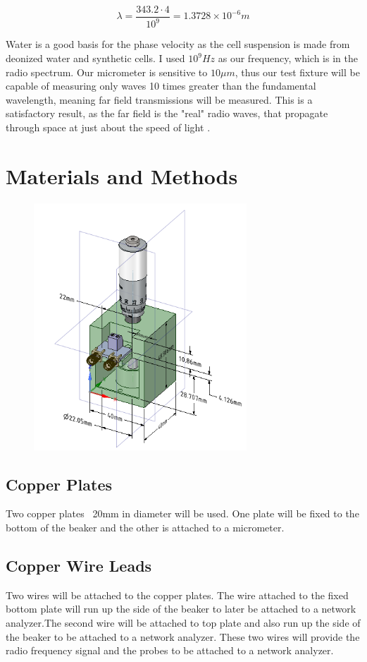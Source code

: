 \documentclass[journal]{IEEEtran}
\begin{document}
\begin{equation}
\label{near-wavelength-water}
\lambda = \frac{343.2 \cdot 4}{10^9} = 1.3728 \times 10^{-6} m
\end{equation}

Water is a good basis for the phase velocity as the cell suspension is made from deonized water and synthetic cells. I used $10^9 Hz$ as our frequency, which is in the radio spectrum. Our micrometer is sensitive to $10\mu m$, thus our test fixture will be capable of measuring only waves 10 times greater than the fundamental wavelength, meaning far field transmissions will be measured. This is a satisfactory result, as the far field is the "real" radio waves, that propagate through space at just about the speed of light \cite{near-far-em}. 

\section{Materials and Methods}

\begin{figure}[h]
\label{test-fixture}
\includegraphics[width=8cm]{Combined_Test_Fixture.png}
\end{figure}

\subsection{Copper Plates}
Two copper plates ~20mm in diameter will be used. One plate will be fixed to the bottom of the beaker and the other is attached to a micrometer.

\subsection{Copper Wire Leads}
Two wires will be attached to the copper plates. The wire attached to the fixed bottom plate will run up the side of the beaker to later be attached to a network analyzer.The second wire will be attached to top plate and also run up the side of the beaker to be attached to a network analyzer. These two wires will provide the radio frequency signal and the probes to be attached to a network analyzer.
\end{document}
